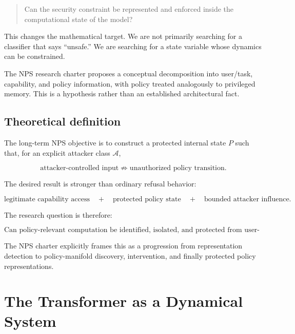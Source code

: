 \documentclass[11pt]{article}
\begin{document}
\begin{quote}
Can the security constraint be represented and enforced inside the
computational state of the model?
\end{quote}

This changes the mathematical target. We are not primarily searching for a
classifier that says ``unsafe.'' We are searching for a state variable whose
dynamics can be constrained.

The NPS research charter proposes a conceptual decomposition into user/task,
capability, and policy information, with policy treated analogously to
privileged memory. This is a hypothesis rather than an established
architectural fact.

\subsection*{Theoretical definition}

The long-term NPS objective is to construct a protected internal state $P$
such that, for an explicit attacker class $\mathcal A$,

\begin{equation}
\text{attacker-controlled input}
\not\Rightarrow
\text{unauthorized policy transition}.
\end{equation}

The desired result is stronger than ordinary refusal behavior:

\begin{equation}
\boxed{
\text{legitimate capability access}
\quad+\quad
\text{protected policy state}
\quad+\quad
\text{bounded attacker influence}.
}
\end{equation}

The research question is therefore:

\begin{equation}
\boxed{
\text{Can policy-relevant computation be identified, isolated,
and protected from user-controlled influence?}
}
\end{equation}

The NPS charter explicitly frames this as a progression from representation
detection to policy-manifold discovery, intervention, and finally protected
policy representations. \cite{nps}

\section{The Transformer as a Dynamical System}
\end{document}
